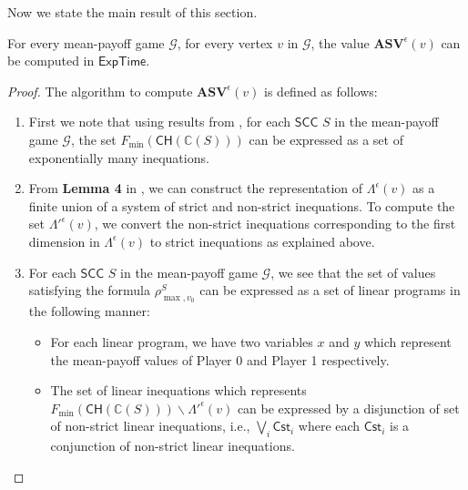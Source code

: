 Now we state the main result of this section.
\begin{theorem}
    For every mean-payoff game $\mathcal{G}$, for every vertex $v$ in $\mathcal{G}$, the value $\mathbf{ASV}^{\epsilon}(v)$ can be computed in $\mathsf{ExpTime}$.
\end{theorem}
\begin{proof}
The algorithm to compute $\mathbf{ASV}^{\epsilon}(v)$ is defined as follows:
\begin{enumerate}
    \item First we note that using 
    results from \cite{CDEHR10},
    for each $\mathsf{SCC}$ $S$ in the mean-payoff game $\mathcal{G}$, the set $F_{\min}(\mathsf{CH}(\mathbb{C}(S)))$ can be expressed as a set of exponentially many inequations.
    \item From \textbf{Lemma 4} in \cite{BR15}, we can construct the representation of $\Lambda^{\epsilon}(v)$ as a finite union of a system of strict and non-strict inequations. To compute the set $\Lambda'^{\epsilon}(v)$, we convert the non-strict inequations corresponding to the first dimension in $\Lambda^{\epsilon}(v)$ to strict inequations as explained above.
    \item For each $\mathsf{SCC}$ $S$ in the mean-payoff game $\mathcal{G}$, we see that the set of values satisfying the formula $\rho^S_{\max,v_0}$ can be expressed as a set of linear programs in the following manner: 
    \begin{itemize}
      \item For each linear program, we have two variables $x$ and $y$ which represent the mean-payoff values of Player 0 and Player 1 respectively.
      \item The set of linear inequations which represents $F_{\min}(\mathsf{CH}(\mathbb{C}(S))) \backslash \Lambda'^{\epsilon}(v)$ can be expressed by a disjunction of set of non-strict linear inequations, i.e., $\bigvee_i \mathsf{Cst}_i$ where each $\mathsf{Cst}_i$ is a conjunction of non-strict linear inequations.

\end{itemize}
\end{enumerate}
\end{proof}
